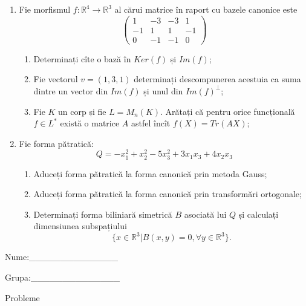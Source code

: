 \documentclass{article}
\begin{document}
\begin{enumerate}
 \item Fie morfismul $f:\mathbb{R}^4 \to \mathbb{R}^3$ al cărui matrice în raport cu bazele canonice este
$$\begin{pmatrix}
1&-3&-3&1\\
-1&1&1&-1\\
0&-1&-1&0
\end{pmatrix}$$

\begin{enumerate}
\item Determinați cîte o bază în $Ker(f)$ și $Im(f)$;
\item Fie vectorul $v=(1,3,1)$ determinați descompunerea acestuia ca suma dintre un vector din $Im(f)$ și unul din $Im(f)^\perp$;
\item Fie $K$ un corp și fie $L=M_n(K)$. Arătați că pentru orice funcțională $f \in L^*$ există o matrice $A$ astfel încît $f(X)=Tr(AX)$;
\end{enumerate}
\item Fie forma pătratică:
$$Q= -x_1^2+x_2^2-5x_3^2+3x_1x_3+4x_2x_3$$

\begin{enumerate}
\item Aduceți forma pătratică la forma canonică prin metoda Gauss;
\item Aduceți forma pătratică la forma canonică prin transformări ortogonale;
\item Determinați forma biliniară simetrică $B$ asociată lui $Q$ și calculați dimensiunea subspațiului
$$\{x \in \mathbb{R}^3 | B(x,y)=0,\forall y \in \mathbb{R}^3\}.$$

\end{enumerate}
\end{enumerate}
\newpage
\begin{flushright}
Nume:\_\_\_\_\_\_\_\_\_\_\_\_\_\_
 
 
Grupa:\_\_\_\_\_\_\_\_\_\_\_\_\_\_
\end{flushright}
\begin{center}
\vspace{2cm}
{\Large Probleme}
\vspace{2cm}
\end{center}
\end{document}
